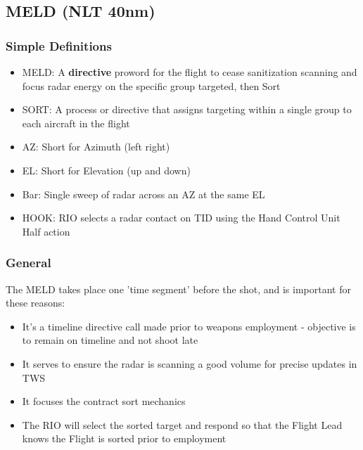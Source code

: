 \subsection{MELD (NLT 40nm)}

\subsubsection*{Simple Definitions}

\begin{itemize}

  \item MELD: A \textbf{directive} proword for the flight to cease sanitization
    scanning and focus radar energy on the specific group targeted, then Sort

  \item SORT: A process or directive that assigns targeting within a single
    group to each aircraft in the flight

  \item AZ: Short for Azimuth (left right)

  \item EL: Short for Elevation (up and down)

  \item Bar: Single sweep of radar across an AZ at the same EL

  \item HOOK: RIO selects a radar contact on TID using the Hand Control Unit
    Half action

\end{itemize}


\subsubsection*{General}

The MELD takes place one 'time segment' before the shot, and is important for
these reasons:

\begin{itemize}
  \item It's a timeline directive call made prior to weapons employment -
    objective is to remain on timeline and not shoot late

  \item It serves to ensure the radar is scanning a good volume for precise
    updates in TWS

  \item It focuses the contract sort mechanics

  \item The RIO will select the sorted target and respond so that the Flight
    Lead knows the Flight is sorted prior to employment

\end{itemize}

